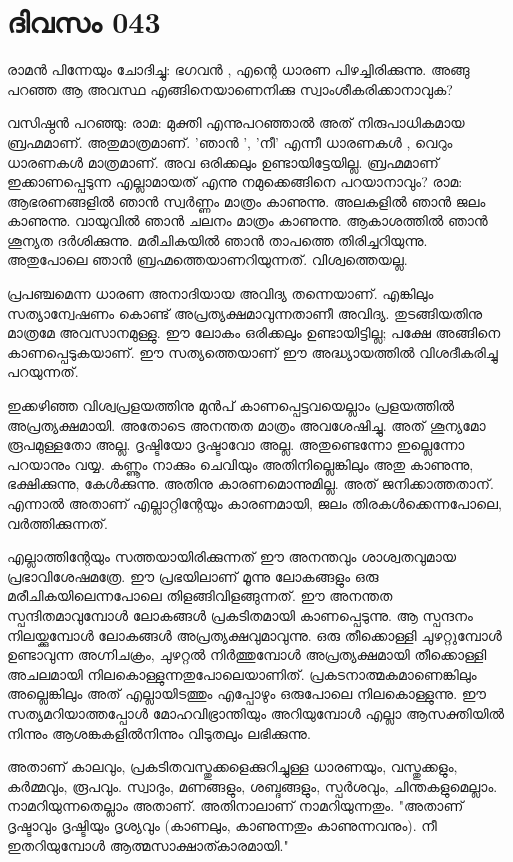  
\section{ദിവസം 043}


രാമന്‍ പിന്നേയും ചോദിച്ചു: ഭഗവന്‍ , എന്റെ ധാരണ പിഴച്ചിരിക്കുന്നു. അങ്ങു പറഞ്ഞ ആ അവസ്ഥ എങ്ങിനെയാണെനിക്കു സ്വാംശീകരിക്കാനാവുക?

വസിഷ്ഠന്‍ പറഞ്ഞു: രാമ: മുക്തി എന്നുപറഞ്ഞാല്‍ അത്‌ നിരുപാധികമായ ബ്രഹ്മമാണ്‌. അതുമാത്രമാണ്‌.  'ഞാന്‍ ', 'നീ' എന്നീ ധാരണകള്‍ , വെറും ധാരണകള്‍ മാത്രമാണ്‌. അവ ഒരിക്കലും ഉണ്ടായിട്ടേയില്ല. ബ്രഹ്മമാണ്‌ ഇക്കാണപ്പെടുന്ന എല്ലാമായത്‌ എന്നു നമുക്കെങ്ങിനെ പറയാനാവും? രാമ: ആഭരണങ്ങളില്‍ ഞാന്‍ സ്വര്‍ണ്ണം മാത്രം കാണുന്നു. അലകളില്‍ ഞാന്‍ ജലം കാണുന്നു. വായുവില്‍ ഞാന്‍ ചലനം മാത്രം കാണുന്നു. ആകാശത്തില്‍ ഞാന്‍ ശൂന്യത ദര്‍ശിക്കുന്നു. മരീചികയില്‍ ഞാന്‍ താപത്തെ തിരിച്ചറിയുന്നു. അതുപോലെ ഞാന്‍ ബ്രഹ്മത്തെയാണറിയുന്നത്‌. വിശ്വത്തെയല്ല.

പ്രപഞ്ചമെന്ന ധാരണ അനാദിയായ അവിദ്യ തന്നെയാണ്‌. എങ്കിലും സത്യാന്വേഷണം കൊണ്ട്‌ അപ്രത്യക്ഷമാവുന്നതാണീ അവിദ്യ. തുടങ്ങിയതിനു മാത്രമേ അവസാനമുള്ളു. ഈ ലോകം ഒരിക്കലും ഉണ്ടായിട്ടില്ല; പക്ഷേ അങ്ങിനെ കാണപ്പെടുകയാണ്‌. ഈ സത്യത്തെയാണ്‌ ഈ അദ്ധ്യായത്തില്‍ വിശദീകരിച്ചു പറയുന്നത്‌. 

ഇക്കഴിഞ്ഞ വിശ്വപ്രളയത്തിനു മുന്‍പ്‌ കാണപ്പെട്ടവയെല്ലാം പ്രളയത്തില്‍ അപ്രത്യക്ഷമായി. അതോടെ അനന്തത മാത്രം അവശേഷിച്ചു. അത്‌ ശൂന്യമോ രൂപമുള്ളതോ അല്ല. ദൃഷ്ടിയോ ദൃഷ്ടാവോ അല്ല. അതുണ്ടെന്നോ ഇല്ലെന്നോ പറയാനും വയ്യ. കണ്ണൂം നാക്കും ചെവിയും അതിനില്ലെങ്കിലും അതു കാണുന്നു, ഭക്ഷിക്കുന്നു, കേള്‍ക്കുന്നു. അതിനു കാരണമൊന്നുമില്ല. അത്‌ ജനിക്കാത്തതാന്‌. എന്നാല്‍ അതാണ്‌ എല്ലാറ്റിന്റേയും കാരണമായി, ജലം തിരകള്‍ക്കെന്നപോലെ, വര്‍ത്തിക്കുന്നത്‌.

എല്ലാത്തിന്റേയും സത്തയായിരിക്കുന്നത്‌ ഈ അനന്തവും ശാശ്വതവുമായ പ്രഭാവിശേഷമത്രേ. ഈ പ്രഭയിലാണ്‌ മൂന്നു ലോകങ്ങളും ഒരു മരീചികയിലെന്നപോലെ തിളങ്ങിവിളങ്ങുന്നത്‌. ഈ അനന്തത സ്പന്ദിതമാവുമ്പോള്‍ ലോകങ്ങള്‍ പ്രകടിതമായി കാണപ്പെടുന്നു. ആ സ്പന്ദനം  നിലയ്ക്കുമ്പോള്‍ ലോകങ്ങള്‍ അപ്രത്യക്ഷവുമാവുന്നു. ഒരു തീക്കൊള്ളി ചുഴറ്റുമ്പോള്‍ ഉണ്ടാവുന്ന അഗ്നിചക്രം, ചുഴറ്റല്‍ നിര്‍ത്തുമ്പോള്‍ അപ്രത്യക്ഷമായി തീക്കൊള്ളി അചലമായി നിലകൊള്ളുന്നതുപോലെയാണിത്‌.  പ്രകടനാത്മകമാണെങ്കിലും  അല്ലെങ്കിലും അത്‌ എല്ലായിടത്തും എപ്പോഴും ഒരുപോലെ നിലകൊള്ളുന്നു. ഈ സത്യമറിയാത്തപ്പോള്‍ മോഹവിഭ്രാന്തിയും അറിയുമ്പോള്‍ എല്ലാ ആസക്തിയില്‍ നിന്നും ആശങ്കകളില്‍നിന്നും വിടുതലും ലഭിക്കുന്നു.

അതാണ്‌ കാലവും, പ്രകടിതവസ്തുക്കളെക്കുറിച്ചുള്ള ധാരണയും, വസ്തുക്കളും, കര്‍മ്മവും, രൂപവും. സ്വാദും, മണങ്ങളും, ശബ്ദങ്ങളും, സ്പര്‍ശവും, ചിന്തകളുമെല്ലാം. നാമറിയുന്നതെല്ലാം അതാണ്‌. അതിനാലാണ്‌ നാമറിയുന്നതും. "അതാണ്‌ ദൃഷ്ടാവും ദൃഷ്ടിയും ദൃശ്യവും (കാണലും, കാണുന്നതും കാണുന്നവനും). നീ ഇതറിയുമ്പോള്‍ ആത്മസാക്ഷാത്കാരമായി."

